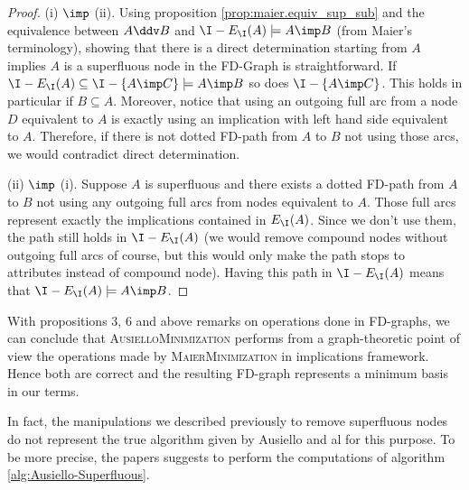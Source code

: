\begin{proof} (i) $\imp$ (ii). Using proposition
\ref{prop:maier.equiv_sup_sub} and the equivalence between $A \ddv B$
and $\I - E_{\I}(A) \models A \imp B$ (from Maier's terminology), showing that there is a direct determination starting from $A$ implies $A$ is a superfluous node in the FD-Graph is straightforward. If $\I - E_{\I}(A) \subseteq \I - \{A \imp C \} \models A \imp B$ so does $\I - \{A \imp C \}$. This holds in particular if $B \subseteq A$. Moreover, notice that using an outgoing full arc from a node $D$ equivalent to $A$ is exactly using an implication with left hand side equivalent to $A$. Therefore, if there is not dotted FD-path from $A$ to $B$ not using those arcs, we would contradict direct determination.

\vspace{1.2em}

(ii) $\imp$ (i). Suppose $A$ is superfluous and there exists a dotted FD-path from $A$ to $B$ not using any outgoing full arcs from nodes equivalent to $A$. Those full arcs represent exactly the implications contained in $E_{\I}(A)$. Since we don't use them, the path still holds in $\I - E_{\I}(A)$ (we would remove compound nodes without outgoing full arcs of course, but this would only make the path stops to attributes instead of compound node). Having this path in $\I - E_{\I}(A)$ means that $\I - E_{\I}(A) \models A \imp B$.
	
\end{proof}

With propositions 3, 6 and above remarks on operations done in FD-graphs, we
can conclude that \textsc{AusielloMinimization} performs from a graph-theoretic point of view the operations made by \textsc{MaierMinimization} in implications
framework. Hence both are correct and the resulting FD-graph represents a minimum basis in our terms. 

\vspace{1.2em}

In fact, the manipulations we described previously to remove superfluous nodes do not represent the true algorithm given by Ausiello and al for this purpose.
To be more precise, the papers \cite{ausiello_graph_1983, ausiello_minimal_1986} suggests to perform the computations of algorithm \ref{alg:Ausiello-Superfluous}.

\vspace{1.2em}

